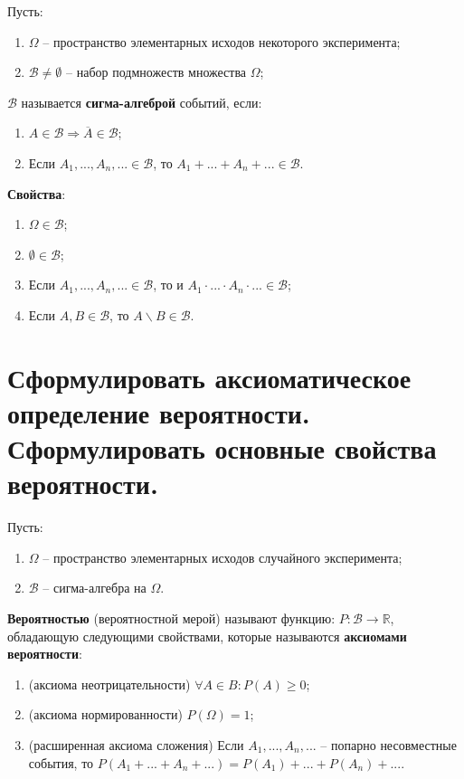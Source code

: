 Пусть:
\begin{enumerate}
	\item $\Omega$ -- пространство элементарных исходов некоторого эксперимента;
	\item $\mathcal{B} \neq \emptyset$ -- набор подмножеств множества $\Omega$;
\end{enumerate}

$\mathcal{B}$ называется \textbf{сигма-алгеброй} событий, если:
\begin{enumerate}
	\item $A \in \mathcal{B} \Rightarrow \overline{A} \in \mathcal{B}$;
	\item Если $A_1, ..., A_n, ... \in \mathcal{B}$, то $A_1 + ... + A_n + ... \in \mathcal{B}$.
\end{enumerate}

\textbf{Свойства}:
\begin{enumerate}
	\item $\Omega \in \mathcal{B}$;
	\item $\emptyset \in \mathcal{B}$;
	\item Если $A_1, ..., A_n, ... \in \mathcal{B}$, то и $A_1 \cdot ... \cdot A_n \cdot ... \in \mathcal{B}$;
	\item Если $A, B \in \mathcal{B}$, то $A \backslash B \in \mathcal{B}$.
\end{enumerate}

\section{Сформулировать аксиоматическое определение вероятности. Сформулировать основные свойства вероятности.}

Пусть:
\begin{enumerate}
	\item $\Omega$ -- пространство элементарных исходов случайного эксперимента;
	\item $\mathcal{B}$ -- сигма-алгебра на $\Omega$.
\end{enumerate}

\textbf{Вероятностью} (вероятностной мерой) называют функцию: $P: \mathcal{B} \rightarrow \mathbb{R}$, обладающую следующими свойствами, которые называются \textbf{аксиомами вероятности}:
\begin{enumerate}
	\item (аксиома неотрицательности) $\forall A \in B: P(A) \geq 0$;
	\item (аксиома нормированности) $P(\Omega) = 1$;
	\item (расширенная аксиома сложения) Если $A_1, ..., A_n, ...$ -- попарно несовместные события, то $P(A_1 + ... + A_n + ...) = P(A_1) + ... + P(A_n) + ...$.
\end{enumerate}

